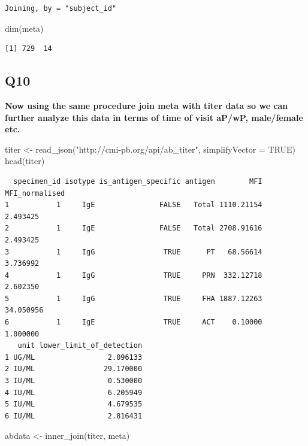 \documentclass[
  letterpaper,
  DIV=11,
  numbers=noendperiod]{scrartcl}
\newenvironment{Shaded}{\begin{snugshade}}{\end{snugshade}}
\newcommand{\AttributeTok}[1]{\textcolor[rgb]{0.40,0.45,0.13}{#1}}
\newcommand{\ConstantTok}[1]{\textcolor[rgb]{0.56,0.35,0.01}{#1}}
\newcommand{\FunctionTok}[1]{\textcolor[rgb]{0.28,0.35,0.67}{#1}}
\newcommand{\NormalTok}[1]{\textcolor[rgb]{0.00,0.23,0.31}{#1}}
\newcommand{\OtherTok}[1]{\textcolor[rgb]{0.00,0.23,0.31}{#1}}
\newcommand{\StringTok}[1]{\textcolor[rgb]{0.13,0.47,0.30}{#1}}
\begin{document}
\begin{verbatim}
Joining, by = "subject_id"
\end{verbatim}

\begin{Shaded}
\begin{Highlighting}[]
\FunctionTok{dim}\NormalTok{(meta)}
\end{Highlighting}
\end{Shaded}

\begin{verbatim}
[1] 729  14
\end{verbatim}

\hypertarget{q10}{%
\subsection{Q10}\label{q10}}

\textbf{Now using the same procedure join meta with titer data so we can
further analyze this data in terms of time of visit aP/wP, male/female
etc.}

\begin{Shaded}
\begin{Highlighting}[]
\NormalTok{titer }\OtherTok{\textless{}{-}} \FunctionTok{read\_json}\NormalTok{(}\StringTok{"http://cmi{-}pb.org/api/ab\_titer"}\NormalTok{, }\AttributeTok{simplifyVector =} \ConstantTok{TRUE}\NormalTok{)}
\FunctionTok{head}\NormalTok{(titer)}
\end{Highlighting}
\end{Shaded}

\begin{verbatim}
  specimen_id isotype is_antigen_specific antigen        MFI MFI_normalised
1           1     IgE               FALSE   Total 1110.21154       2.493425
2           1     IgE               FALSE   Total 2708.91616       2.493425
3           1     IgG                TRUE      PT   68.56614       3.736992
4           1     IgG                TRUE     PRN  332.12718       2.602350
5           1     IgG                TRUE     FHA 1887.12263      34.050956
6           1     IgE                TRUE     ACT    0.10000       1.000000
   unit lower_limit_of_detection
1 UG/ML                 2.096133
2 IU/ML                29.170000
3 IU/ML                 0.530000
4 IU/ML                 6.205949
5 IU/ML                 4.679535
6 IU/ML                 2.816431
\end{verbatim}

\begin{Shaded}
\begin{Highlighting}[]
\NormalTok{abdata }\OtherTok{\textless{}{-}} \FunctionTok{inner\_join}\NormalTok{(titer, meta)}
\end{Highlighting}
\end{Shaded}
\end{document}
